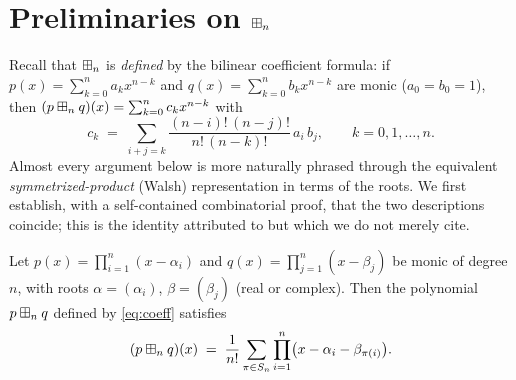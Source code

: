 \section*{Preliminaries on $\boxplus_n$}

Recall that $\boxplus_n$ is \emph{defined} by the bilinear coefficient formula: if
$p(x)=\sum_{k=0}^n a_kx^{n-k}$ and $q(x)=\sum_{k=0}^n b_kx^{n-k}$ are monic
($a_0=b_0=1$), then $(p\boxplus_n q)(x)=\sum_{k=0}^n c_kx^{n-k}$ with
\begin{equation}\label{eq:coeff}
c_k\;=\;\sum_{i+j=k}\frac{(n-i)!\,(n-j)!}{n!\,(n-k)!}\,a_i\,b_j ,
\qquad k=0,1,\dots,n .
\end{equation}
Almost every argument below is more naturally phrased through the equivalent
\emph{symmetrized-product} (Walsh) representation in terms of the roots. We first
establish, with a self-contained combinatorial proof, that the two descriptions
coincide; this is the identity attributed to \cite{MSS22} but which we do not
merely cite.

\begin{qfourlemma}[coefficient formula $=$ symmetrized product]\label{lem:walsh-eq}
Let $p(x)=\prod_{i=1}^n(x-\alpha_i)$ and $q(x)=\prod_{j=1}^n(x-\beta_j)$ be monic
of degree $n$, with roots $\alpha=(\alpha_i)$, $\beta=(\beta_j)$ (real or
complex). Then the polynomial $p\boxplus_n q$ defined by \eqref{eq:coeff} satisfies
\begin{equation}\label{eq:walsh}
(p\boxplus_n q)(x)\;=\;\frac{1}{n!}\sum_{\pi\in S_n}\prod_{i=1}^n\bigl(x-\alpha_i-\beta_{\pi(i)}\bigr).
\end{equation}
\end{qfourlemma}

